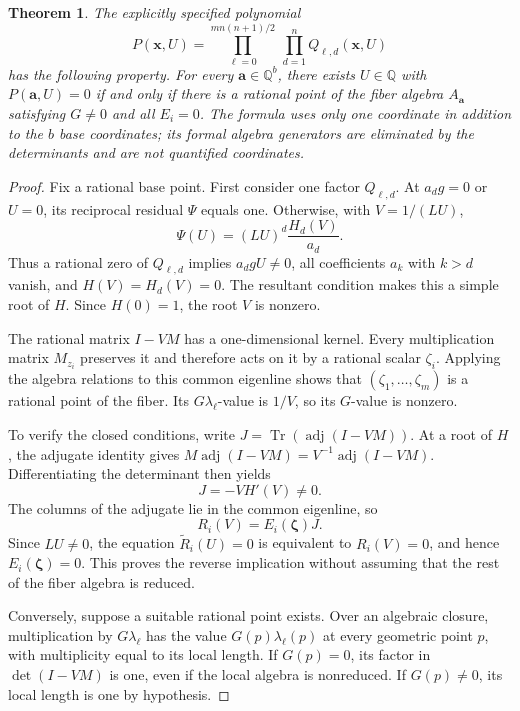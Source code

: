 \documentclass[11pt,a4paper]{article}
\newtheorem{theorem}{Theorem}[section]
\theoremstyle{definition}
\theoremstyle{remark}
\begin{document}
\begin{theorem}\label{thm:explicit-guarded-finite-algebra}
The explicitly specified polynomial
\[
 P(\mathbf x,U)=
 \prod_{\ell=0}^{m n(n+1)/2}\ \prod_{d=1}^{n} Q_{\ell,d}(\mathbf x,U)
\]
has the following property. For every $\mathbf a\in\mathbb Q^b$,
there exists $U\in\mathbb Q$ with $P(\mathbf a,U)=0$ if and only if
there is a rational point of the fiber algebra $A_{\mathbf a}$ satisfying
$G\ne0$ and all $E_i=0$. The formula uses only one coordinate in addition
to the $b$ base coordinates; its formal algebra generators are eliminated
by the determinants and are not quantified coordinates.
\end{theorem}
\begin{proof}
Fix a rational base point. First consider one factor $Q_{\ell,d}$.
At $a_dg=0$ or $U=0$, its reciprocal residual $\Psi$ equals one.
Otherwise, with $V=1/(LU)$,
\[
 \Psi(U)=(LU)^d\frac{H_d(V)}{a_d}.
\]
Thus a rational zero of $Q_{\ell,d}$ implies $a_dgU\ne0$, all
coefficients $a_k$ with $k>d$ vanish, and $H(V)=H_d(V)=0$.
The resultant condition makes this a simple root of $H$. Since
$H(0)=1$, the root $V$ is nonzero.

The rational matrix $I-VM$ has a one-dimensional kernel. Every
multiplication matrix $M_{z_i}$ preserves it and therefore acts on
it by a rational scalar $\zeta_i$. Applying the algebra relations
to this common eigenline shows that $(\zeta_1,\ldots,\zeta_m)$ is
a rational point of the fiber. Its $G\lambda_\ell$-value is $1/V$,
so its $G$-value is nonzero.

To verify the closed conditions, write
$J=\operatorname{Tr}(\operatorname{adj}(I-VM))$. At a root of $H$,
the adjugate identity gives
$M\operatorname{adj}(I-VM)=V^{-1}\operatorname{adj}(I-VM)$.
Differentiating the determinant then yields
\[
 J=-V H'(V)\ne0.
\]
The columns of the adjugate lie in the common eigenline, so
\[
 R_i(V)=E_i(\boldsymbol\zeta)J.
\]
Since $LU\ne0$, the equation $\widetilde R_i(U)=0$ is equivalent
to $R_i(V)=0$, and hence $E_i(\boldsymbol\zeta)=0$. This proves
the reverse implication without assuming that the rest of the fiber
algebra is reduced.

Conversely, suppose a suitable rational point exists. Over an
algebraic closure, multiplication by $G\lambda_\ell$ has the
value $G(p)\lambda_\ell(p)$ at every geometric point $p$, with
multiplicity equal to its local length. If $G(p)=0$, its factor
in $\det(I-VM)$ is one, even if the local algebra is nonreduced.
If $G(p)\ne0$, its local length is one by hypothesis.


\end{proof}
\end{document}
